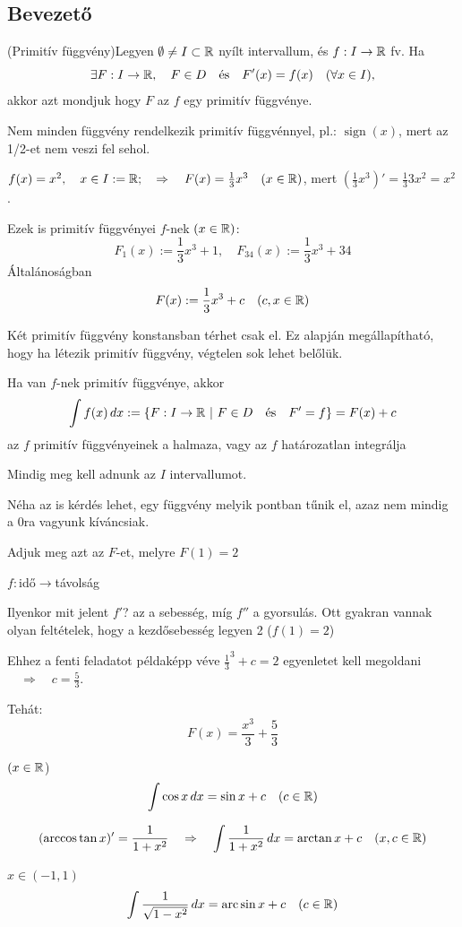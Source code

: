 \documentclass[a4paper,11.5pt]{article}
\DeclareMathOperator{\sign}{sign}
\DeclareMathOperator{\arc}{arc}
\begin{document}
	\subsection{Bevezető}
	\begin{revision}
		(Primitív függvény)\quad Legyen $\emptyset\not=I\subset\mathbb{R}$ nyílt intervallum, és $f:I\to\mathbb{R}$ fv. Ha 
		\[\exists F:I\to\mathbb{R}, \quad F\in D\quad  \text{és}\quad  F'(x)=f(x) \quad (\forall x\in I),\]
		akkor azt mondjuk hogy $F$ az $f$ egy primitív függvénye.
	\end{revision}
	Nem minden függvény rendelkezik primitív függvénnyel, pl.: $\sign(x)$, mert az 1/2-et nem veszi fel sehol.
	\begin{note}
	$f(x)=x^2,\quad x\in I:=\mathbb{R};\quad \Rightarrow\quad F(x)=\frac{1}{3}x^3\quad (x\in\mathbb{R})$, mert $\left(\frac{1}{3}x^3\right)'=\frac{1}{3}3x^2=x^2$.
	
	Ezek is primitív függvényei $f$-nek $(x\in\mathbb{R})$:
	\[ F_1(x):=\frac{1}{3}x^3+1,\quad  F_{34}(x):=\frac{1}{3}x^3+34 \]
	Általánoságban
	\[ F(x):=\frac{1}{3}x^3+c\quad (c, x\in\mathbb{R}) \]
	\end{note}
	Két primitív függvény konstansban térhet csak el. Ez alapján megállapítható, hogy ha létezik primitív függvény, végtelen sok lehet belőlük.
	\begin{note}
		Ha van $f$-nek primitív függvénye, akkor
		\[  \int f(x)\,dx:=\{F:I\to\mathbb{R}~|~F\in D \text{\quad és\quad } F'=f \} =F(x) + c \]
		az $f$ primitív függvényeinek a halmaza, vagy az $f$ határozatlan integrálja
	\end{note}
	Mindig meg kell adnunk az $I$ intervallumot.
	
	Néha az is kérdés lehet, egy függvény melyik pontban tűnik el, azaz nem mindig a 0ra vagyunk kíváncsiak.
	\begin{task}
		Adjuk meg azt az $F$-et, melyre $F(1)=2$
	\end{task}
	\begin{revision}
		$f:$idő$\to$távolság
		
		Ilyenkor mit jelent $f'$? az a sebesség, míg $f''$ a gyorsulás. Ott gyakran vannak olyan feltételek, hogy a kezdősebesség legyen 2 ($f(1)=2$)
		
		Ehhez a fenti feladatot példaképp véve $\frac{1}{3}^3+c=2$ egyenletet kell megoldani $\quad \Rightarrow\quad c=\frac{5}{3}$.
	\end{revision}
	Tehát:
	\[ F(x)=\frac{x^3}{3}+\frac{5}{3} \]
	\begin{task}$(x\in\mathbb{R}$)
		\[\int \cos x\,dx=\sin x+c\quad (c\in\mathbb{R}) \]
	\end{task}
	\begin{task}
		\[ (\arccos\tan x)' =\frac{1}{1+x^2}\quad \Rightarrow\quad \int\frac{1}{1+x^2}\,dx=\arctan x + c\quad (x,c\in \mathbb{R}) \]
	\end{task}
	\begin{task} $x\in(-1,1)$
		\[ \int\frac{1}{\sqrt{1-x^2}}\,dx=\arc\sin x + c \quad (c\in \R) \]
	\end{task}
\end{document}
